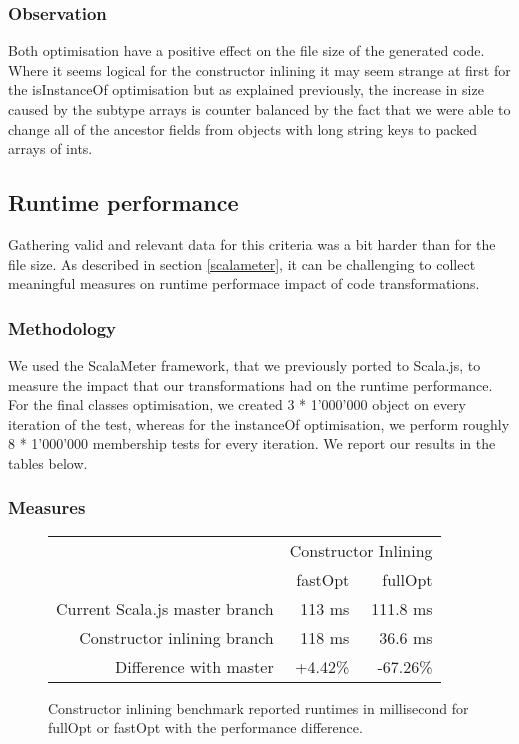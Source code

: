 \subsubsection{Observation}
Both optimisation have a positive effect on the file size of the generated
code. Where it seems logical for the constructor inlining it may seem
strange at first for the isInstanceOf optimisation but as explained previously,
the increase in size caused by the subtype arrays is counter balanced by the
fact that we were able to change all of the ancestor fields from objects with
long string keys to packed arrays of ints.

\subsection{Runtime performance}
Gathering valid and relevant data for this criteria was a bit harder than for
the file size. As described in section \ref{scalameter}, it can be challenging
to collect meaningful measures on runtime performace impact of code
transformations.

\subsubsection{Methodology}
We used the ScalaMeter framework, that we previously ported to Scala.js, to
measure the impact that our transformations had on the runtime performance.
For the final classes optimisation, we created 3 * 1'000'000 object on every
iteration of the test, whereas for the instanceOf optimisation, we perform
roughly 8 * 1'000'000 membership tests for every iteration. We report our
results in the tables below.


\subsubsection{Measures}

\begin{figure}[H]
  \centering
  \begin{tabular}{ | r | r | r | }\hline
    & \multicolumn{2}{|c|}{Constructor Inlining} \\
    & fastOpt & fullOpt \\ \hline
    Current Scala.js master branch & 113 ms & 111.8 ms\\
\hline \hline
    Constructor inlining branch & 118 ms & 36.6 ms \\ \hline
    Difference with master & +4.42\% & -67.26\%\\ \hline
 \end{tabular}
  \captionsetup{justification=centering}
  \caption{Constructor inlining benchmark reported runtimes in millisecond for
fullOpt or fastOpt with the performance difference.}
  \label{fig:run_times_ctor}
\end{figure}


